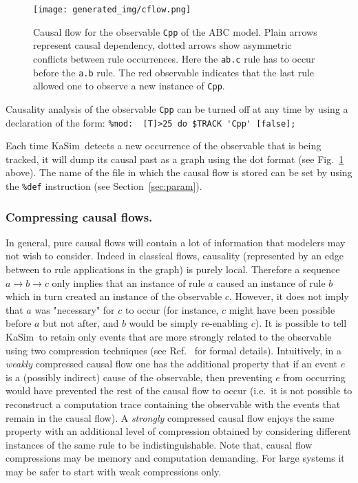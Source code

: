 \documentclass[11pt]{book}
\def\KaSim{\textsf{KaSim}}
\def\ttt#1{\texttt{#1}}
\def\rar{\rightarrow}
\def\ie{i.e.~}
\begin{document}
\begin{figure}[htbp]
\begin{center}
\texttt{[image: generated\_img/cflow.png]}
\caption{Causal flow for the observable \ttt{{\textquotesingle}Cpp{\textquotesingle}} of the ABC model. Plain arrows represent causal dependency, dotted arrows show asymmetric conflicts between rule occurrences. Here the \ttt{{\textquotesingle}ab.c{\textquotesingle}} rule has to occur before the \ttt{{\textquotesingle}a.b{\textquotesingle}} rule. The red observable indicates that the last rule allowed one to observe a new instance of \ttt{{\textquotesingle}Cpp{\textquotesingle}}.}
\label{fig:cflow}
\end{center}
\end{figure}

Causality analysis of the observable \ttt{Cpp} can be turned off at any time by using a declaration of the form:
\lstinline[language=kappa]!%mod:  [T]>25 do $TRACK 'Cpp' [false];!

Each time \KaSim~detects a new occurrence of the observable that is being tracked, it will dump its causal past as a graph using the dot format (see Fig.~\ref{fig:cflow} above). The name of the file in which the causal flow is stored can be set by using the \texttt{\%def} instruction (see Section~\ref{sec:param}).

\subsubsection*{Compressing causal flows.}

In general, pure causal flows will contain a lot of information that modelers may not wish to consider. Indeed in classical flows, causality (represented by an edge between to rule applications in the graph) is purely local. Therefore a sequence $a\rar b \rar c$ only implies that an instance of rule $a$ caused an instance of rule $b$ which in turn created an instance of the observable $c$. However, it does not imply that $a$ was "necessary" for $c$ to occur (for instance, $c$ might have been possible before $a$ but not after, and $b$ would be simply re-enabling $c$). It is possible to tell \KaSim~to retain only events that are more strongly related to the observable using two compression techniques (see Ref.~\cite{Dan_etal12} for formal details). Intuitively, in a \emph{weakly} compressed causal flow one has the additional property that if an event $e$ is a (possibly indirect) cause of the observable, then preventing $e$ from occurring would have prevented the rest of the causal flow to occur ({\ie}it is not possible to reconstruct a computation trace containing the observable with the events that remain in the causal flow). A \emph{strongly} compressed causal flow enjoys the same property with an additional level of compression obtained by considering different instances of the same rule to be indistinguishable. Note that, causal flow compressions may be memory and computation demanding. For large systems it may be safer to start with weak compressions only.
\end{document}
